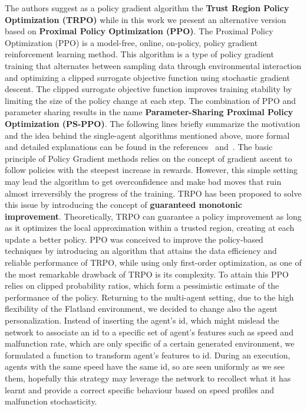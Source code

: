\documentclass[11pt, a4paper, hidelinks]{report}
\begin{document}
The authors suggest as a policy gradient algorithm the \textbf{Trust Region Policy Optimization (TRPO)} while in this work we present an alternative version based on \textbf{Proximal Policy Optimization (PPO)}.
The Proximal Policy Optimization (PPO) is a model-free, online, on-policy, policy gradient reinforcement learning method.
This algorithm is a type of policy gradient training that alternates between sampling data through environmental interaction and optimizing a clipped surrogate objective function using stochastic gradient descent.
The clipped surrogate objective function improves training stability by limiting the size of the policy change at each step.
The combination of PPO and parameter sharing results in the name \textbf{Parameter-Sharing Proximal Policy Optimization (PS-PPO)}.
The following lines briefly summarize the motivation and the idea behind the single-agent algorithms mentioned above, more formal and detailed explanations can be found in the references~\citep{trpo} and~\citep{ppo}.
The basic principle of Policy Gradient methods relies on the concept of gradient ascent to follow policies with the steepest increase in rewards.
However, this simple setting may lead the algorithm to get overconfidence and make bad moves that ruin almost irreversibly the progress of the training.
TRPO has been proposed to solve this issue by introducing the concept of \textbf{guaranteed monotonic improvement}.
Theoretically, TRPO can guarantee a policy improvement as long as it optimizes the local approximation within a trusted region, creating at each update a better policy.
PPO was conceived to improve the policy-based techniques by introducing an algorithm that attains the data efficiency and reliable performance of TRPO, while using only first-order optimization, as one of the most remarkable drawback of TRPO is its complexity.
To attain this PPO relies on clipped probability ratios, which form a pessimistic estimate of the performance of the policy.
Returning to the multi-agent setting, due to the high flexibility of the Flatland environment, we decided to change also the agent personalization.
Instead of inserting the agent's id, which might mislead the network to associate an id to a specific set of agent's features such as speed and malfunction rate, which are only specific of a certain generated environment, we formulated a function to transform agent's features to id.
During an execution, agents with the same speed have the same id, so are seen uniformly as we see them, hopefully this strategy may leverage the network to recollect what it has learnt and provide a correct specific behaviour based on speed profiles and malfunction stochasticity.
\end{document}
